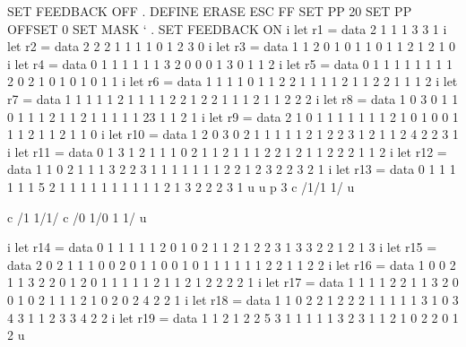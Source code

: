 SET FEEDBACK OFF                                                                
.                                                                               
DEFINE ERASE ESC FF                                                             
SET PP 20                                                                       
SET PP OFFSET 0                                                                 
SET MASK `                                                                      
.                                                                               
SET FEEDBACK ON                                                                 
i let r1 = data 2 1 1 1 3 3 1                                                   
i let r2 = data 2 2 2 1 1 1 1 0 1 2 3 0                                         
i let r3 = data 1 1 2 0 1 0 1 1 0 1 1 2 1 2 1 0                                 
i let r4 = data 0 1 1 1 1 1 1 3 2 0 0 0 1 3 0 1 1 2                             
i let r5 = data 0 1 1 1 1 1 1 1 1 2 0 2 1 0 1 0 1 0 1 1                         
i let r6 = data 1 1 1 1 0 1 1 2 2 1 1 1 1 2 1 1 2 2 1 1 1 2                     
i let r7 = data 1 1 1 1 1 2 1 1 1 1 2 2 1 2 2 1 1 1 2 1 1 2 2 2                 
i let r8 = data 1 0 3 0 1 1 0 1 1 1 2 1 1 2 1 1 1 1 1 23 1 1 2 1                
i let r9 = data 2 1 0 1 1 1 1 1 1 1 2 1 0 1 0 0 1 1 1 2 1 1 2 1 1 0             
i let r10 = data 1 2 0 3 0 2 1 1 1 1 1 2 1 2 2 3 1 2 1 1 2 4 2 2 3 1            
i let r11 = data 0 1 3 1 2 1 1 1 0 2 1 1 2 1 1 1 2 2 1 2 1 1 2 2 2 1 1 2        
i let r12 = data 1 1 0 2 1 1 1 3 2 2 3 1 1 1 1 1 1 1 2 2 1 2 3 2 2 3 2 1        
i let r13 = data 0 1 1 1 1 1 1 5 2 1 1 1 1 1 1 1 1 1 1 2 1 3 2 2 2 3 1          
u                                                                               
u                                                                               
p 3                                                                             
c /1/1 1/                                                                       
u                                                                               
                                                                                
c /1 1/1/                                                                       
c /0 1/0 1 1/                                                                   
u                                                                               
                                                                                
                                                                                
i let r14 = data 0 1 1 1 1 1 2 0 1 0 2 1 1 2 1 2 2 3 1 3 3 2 2 1 2 1 3          
i let r15 = data 2 0 2 1 1 1 0 0 2 0 1 1 0 0 1 0 1 1 1 1 1 1 2 2 1 1 2 2        
i let r16 = data 1 0 0 2 1 1 3 2 2 0 1 2 0 1 1 1 1 1 2 1 1 2 1 2 2 2 2 1        
i let r17 = data 1 1 1 1 2 2 1 1 3 2 0 0 1 0 2 1 1 1 2 1 0 2 0 2 4 2 2 1        
i let r18 = data 1 1 0 2 2 1 2 2 2 1 1 1 1 1 3 1 0 3 4 3 1 1 2 3 3 4 2 2        
i let r19 = data 1 1 2 1 2 2 5 3 1 1 1 1 1 3 2 3 1 1 2 1 0 2 2 0 1 2            
u                                                                               
                                                                                
